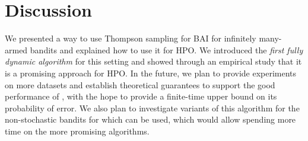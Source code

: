 \section{Discussion}\label{sec:dttts.discussion}

We presented a way to use Thompson sampling for BAI for infinitely many-armed bandits and explained how to use it for HPO. We introduced the \textit{first fully dynamic algorithm} for this setting and showed through an empirical study that it is a promising approach for HPO. In the future, we plan to provide experiments on more datasets and establish theoretical guarantees to support the good performance of \DTTTS, with the hope to provide a finite-time upper bound on its probability of error. We also plan to investigate variants of this algorithm for the non-stochastic bandits for which \Hyperband can be used, which would allow spending more time on the more promising algorithms.
